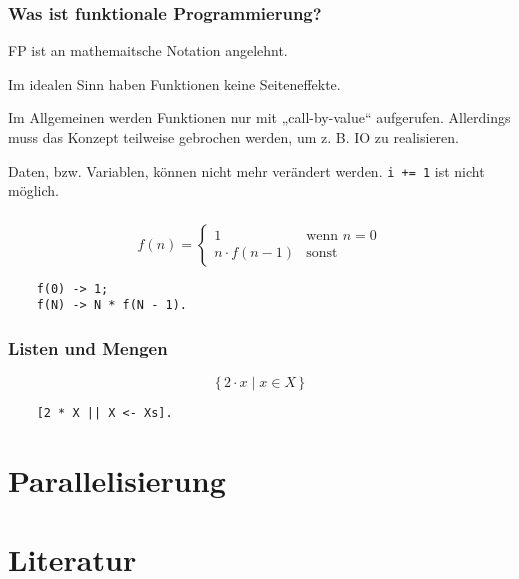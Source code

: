 \documentclass[compress]{beamer}
\begin{document}
\begin{frame}
  \frametitle{Was ist funktionale Programmierung?}

  FP ist an mathemaitsche Notation angelehnt.

  Im idealen Sinn haben Funktionen keine Seiteneffekte.

  Im Allgemeinen werden Funktionen nur mit „call-by-value“ aufgerufen.
  Allerdings muss das Konzept teilweise gebrochen werden, um z. B. IO
  zu realisieren.

  Daten, bzw. Variablen, können nicht mehr verändert
  werden. \lstinline{i += 1} ist nicht möglich. %


\end{frame}

\begin{frame}[fragile]
  \frametitle{}
  $$
  f(n) =
  \begin{cases}
    1             &\textrm{wenn } n = 0 \\
    n \cdot f(n - 1) & \textrm{sonst}
  \end{cases}
  $$
  \vfill

  \begin{lstlisting}
    f(0) -> 1;
    f(N) -> N * f(N - 1).
  \end{lstlisting}
\end{frame}

\begin{frame}[fragile]
  \frametitle{Listen und Mengen}
  $$ \{\,2 \cdot x \mid x \in X\,\}$$

  \vfill

  \begin{lstlisting}
    [2 * X || X <- Xs].
  \end{lstlisting}
\end{frame}
\section{Parallelisierung}
\label{sec:parallelisierung}


\section{Literatur}
\label{sec:literatur}


\end{document}
